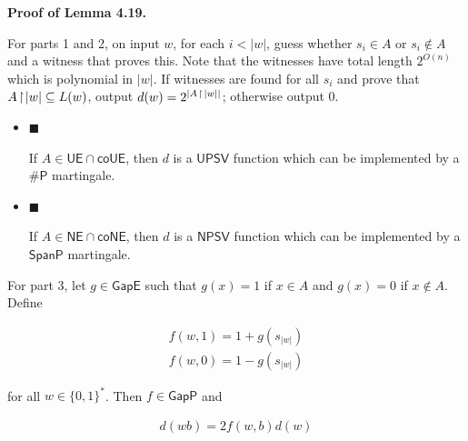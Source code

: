 


\par\medskip\noindent\textbf{Proof of Lemma 4.19.}\par




For parts 1 and 2, on input $w$, for each $i<|w|$, guess whether $s_{i}\in A$ or $s_{i}\not\in A$ and a witness that proves this.
Note that the witnesses have total length $2^{O(n)}$ which is polynomial in $|w|$. If witnesses are found for all $s_{i}$ and prove that $A\negthinspace\upharpoonright\negthinspace|w|\subseteq L(w)$, output $d(w)=2^{|A\;\negthinspace\upharpoonright\negthinspace\;|w||}$; otherwise output $0$.\par


\begin{itemize}


\item[] 
$\blacksquare$ 


If $A\in\mathsf{UE}\cap\mathsf{co}\mathsf{UE}$, then $d$ is a $\mathsf{UPSV}$ function which can be implemented by a ${\mathsf{\#}\mathsf{P}}$ martingale.\par





\item[] 
$\blacksquare$ 


If $A\in\mathsf{NE}\cap\mathsf{co}\mathsf{NE}$, then $d$ is a $\mathsf{NPSV}$ function which can be implemented by a $\mathsf{SpanP}$ martingale.\par





\end{itemize}


For part 3, let $g\in\mathsf{GapE}$ such that $g(x)=1$ if $x\in A$ and $g(x)=0$ if $x\not\in A$. Define\par


\[\begin{gathered}
\displaystyle f(w,1) \displaystyle= \displaystyle 1+g(s_{|w|}) \\
\displaystyle f(w,0) \displaystyle= \displaystyle 1-g(s_{|w|})
\end{gathered}\]


for all $w\in\{0,1\}^{*}$. Then $f\in\mathsf{GapP}$ and\par


\[\begin{gathered}
d(wb)=2f(w,b)d(w)
\end{gathered}\]


